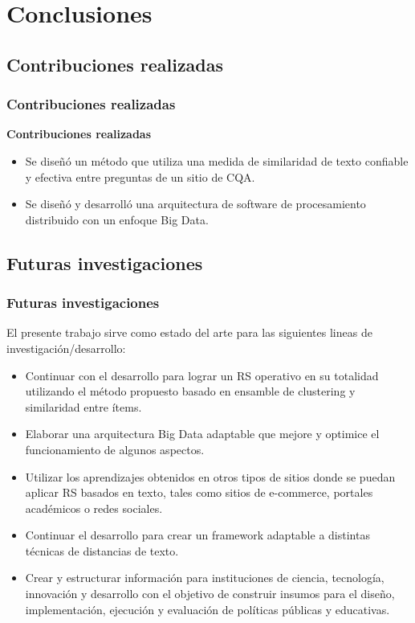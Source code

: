 \section{Conclusiones}

\subsection{Contribuciones realizadas}
\begin{frame}
	\frametitle{Contribuciones realizadas}
	\textbf{Contribuciones realizadas}
	\bigskip

	\begin{itemize}
		\item Se diseñó un método que utiliza una medida de similaridad de texto confiable y efectiva entre preguntas de un sitio de CQA.
		\bigskip
		\item Se diseñó y desarrolló una arquitectura de software de procesamiento distribuido con un enfoque Big Data.
	\end{itemize}
\end{frame}

\subsection{Futuras investigaciones}
\begin{frame}
	\frametitle{Futuras investigaciones}
	El presente trabajo sirve como estado del arte para las siguientes lineas de investigación/desarrollo:
	\bigskip

	\begin{footnotesize}
		\footnotesize
			\begin{itemize}
				\item Continuar con el desarrollo para lograr un RS operativo en su totalidad utilizando el método propuesto basado en ensamble de clustering y similaridad entre ítems.
				\item Elaborar una arquitectura Big Data adaptable que mejore y optimice el funcionamiento de algunos aspectos.
				\item Utilizar los aprendizajes obtenidos en otros tipos de sitios donde se puedan aplicar RS basados en texto, tales como sitios de e-commerce, portales académicos o redes sociales.
				\item Continuar el desarrollo para crear un framework adaptable a distintas técnicas de distancias de texto.
				\item Crear y estructurar información para instituciones de ciencia, tecnología, innovación y desarrollo con el objetivo de construir insumos para el diseño, implementación, ejecución y evaluación de políticas públicas y educativas.
			\end{itemize}
	\end{footnotesize}
\end{frame}